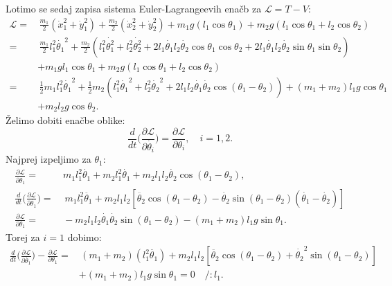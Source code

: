 \documentclass[a4paper,11pt]{article}
\begin{document}
Lotimo se sedaj zapisa sistema Euler-Lagrangeevih enačb \cite{wikipedia:lagrangian} za $\mathcal{L} = T-V$:
\begin{align*}
    \mathcal{L} =& \, \frac{m_1}{2}(\dot{x}_1^2 + \dot{y}_1^2) + \frac{m_2}{2}(\dot{x}_2^2 + \dot{y}_2^2) + m_1 g(l_1 \cos\theta_1) + m_2 g(l_1 \cos\theta_1 + l_2 \cos\theta_2)\\
    =& \, \frac{m_1}{2}l_1^2 \dot{\theta_1}^2 + \frac{m_2}{2}(l_1^2 \dot{\theta_1^2} + l_2^2 \dot{\theta_2^2} + 2 l_1 \dot{\theta_1} l_2 \dot{\theta_2} \cos \theta_1 \cos \theta_2 + 2 l_1 \dot{\theta_1}l_2 \dot{\theta_2} \sin \theta_1 \sin \theta_2) \\
    &+ m_1 g l_1 \cos\theta_1 + m_2 g (l_1 \cos\theta_1 + l_2 \cos\theta_2)\\
    =& \, \frac{1}{2}m_1 l_1^2 \dot{\theta_1}^2 + \frac{1}{2}m_2(l_1^2 \dot{\theta_1}^2 + l_2^2 \dot{\theta_2}^2 + 2 l_1 l_2 \dot{\theta_1} \dot{\theta_2} \cos (\theta_1 - \theta_2)) + (m_1 + m_2)l_1 g \cos \theta_1 \\
    &+ m_2 l_2 g \cos \theta_2.
\end{align*}
Želimo dobiti enačbe oblike:
$$\frac{d}{dt} \Big(\frac{\partial \mathcal{L}}{\partial \dot{\theta_i}}\Big) = \frac{\partial \mathcal{L}}{\partial \theta_i}, \quad i = 1,2.$$
Najprej izpeljimo za $\theta_1$:
\begin{align*}
    \frac{\partial \mathcal{L}}{\partial \dot{\theta_1}} =& \, m_1 l_1^2 \dot{\theta_1} + m_2 l_1^2 \dot{\theta_1} + m_2 l_1 l_2 \dot{\theta_2} \cos(\theta_1 - \theta_2),\\
    \frac{d}{dt} \Big(\frac{\partial \mathcal{L}}{\partial \dot{\theta_1}}\Big) =& \, \, m_1 l_1^2 \ddot{\theta_1} + m_2 l_1 l_2 [\ddot{\theta_2} \cos(\theta_1 - \theta_2)- \dot{\theta_2} \sin(\theta_1 - \theta_2)(\dot{\theta_1}-\dot{\theta_2})]\\
    \frac{\partial \mathcal{L}}{\partial \theta_1} =& \, -m_2 l_1 l_2 \dot{\theta_1}\dot{\theta_2} \sin (\theta_1 - \theta_2) - (m_1 + m_2) l_1 g \sin\theta_1.
\end{align*}
Torej za $i=1$ dobimo:
\begin{align*}
    \frac{d}{dt} \Big(\frac{\partial \mathcal{L}}{\partial \dot{\theta_1}}\Big) - \frac{\partial \mathcal{L}}{\partial \theta_1} =& \, (m_1 + m_2) (l_1^2 \ddot{\theta_1}) + m_2 l_1 l_2 [\ddot{\theta_2}\cos (\theta_1 - \theta_2) + \dot{\theta_2}^2 \sin(\theta_1 - \theta_2)] \\
    &+(m_1 + m_2)l_1 g \sin \theta_1 = 0 \quad /:l_1.
\end{align*}
\end{document}

